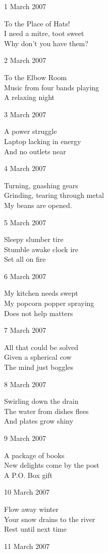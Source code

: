 \documentclass[12pt]{article}
\begin{document}
1 March 2007

To the Place of Hats! \\
I need a mitre, toot sweet \\
Why don't you have them?

2 March 2007

To the Elbow Room \\
Music from four bands playing \\
A relaxing night

3 March 2007

A power struggle \\
Laptop lacking in energy \\
And no outlets near

4 March 2007

Turning, gnashing gears \\
Grinding, tearing through metal \\
My beans are opened.

\newpage

5 March 2007

Sleepy slumber tire  \\
Stumble awake clock ire \\
Set all on fire

6 March 2007

My kitchen needs swept \\
My popcorn popper spraying \\
Does not help matters

7 March 2007

All that could be solved \\
Given a spherical cow \\
The mind just boggles

8 March 2007

Swirling down the drain \\
The water from dishes flees \\
And plates grow shiny

9 March 2007

A package of books \\
New delights come by the post \\
A P.O. Box gift

10 March 2007

Flow away winter \\
Your snow drains to the river \\
Rest until next time

11 March 2007
\end{document}
